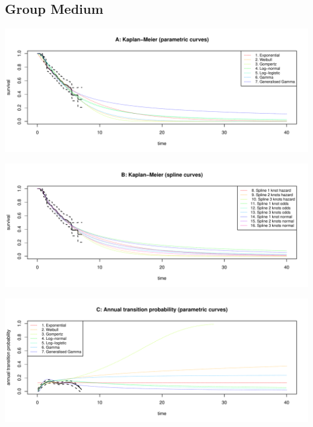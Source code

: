 \documentclass[]{article}
\begin{document}
\newpage

\subsection{Group Medium}\label{group-medium}

\begin{flushleft}\includegraphics[height=0.29\textheight]{Images/validate_extrapolation2-1} \end{flushleft}

\begin{flushleft}\includegraphics[height=0.29\textheight]{Images/validate_extrapolation2-2} \end{flushleft}

\begin{flushleft}\includegraphics[height=0.29\textheight]{Images/validate_extrapolation2-3} \end{flushleft}
\end{document}
